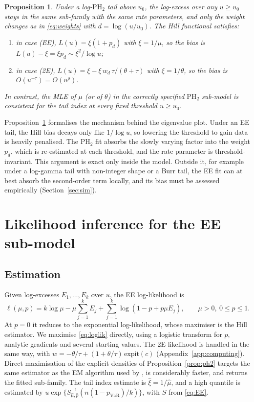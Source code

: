 \documentclass[12pt]{article}
\newtheorem{proposition}[theorem]{Proposition}
\theoremstyle{definition}
\theoremstyle{remark}
\newcommand{\PH}{\mathrm{PH}}
\begin{document}
\begin{proposition}\label{prop:hill}
Under a log-$\PH_2$ tail above $u_0$, the log-excess over any $u\ge u_0$ stays in the same sub-family with the same rate parameters, and only the weight changes as in \eqref{eq:weights} with $d=\log(u/u_0)$. The Hill functional satisfies:
\begin{enumerate}
\item[(a)] in case \textup{(EE)}, $L(u)=\xi(1+p_d)$ with $\xi=1/\mu$, so the bias is $L(u)-\xi=\xi p_d\sim \xi^2/\log u$;
\item[(b)] in case \textup{(2E)}, $L(u)=\xi-\xi\,w_d\,\tau/(\theta+\tau)$ with $\xi=1/\theta$, so the bias is $O(u^{-\tau})=O(u^{\rho})$.
\end{enumerate}
In contrast, the MLE of $\mu$ (or of $\theta$) in the correctly specified $\PH_2$ sub-model is consistent for the tail index at every fixed threshold $u\ge u_0$.
\end{proposition}

Proposition~\ref{prop:hill} formalises the mechanism behind the eigenvalue plot. Under an EE tail, the Hill bias decays only like $1/\log u$, so lowering the threshold to gain data is heavily penalised. The PH$_2$ fit absorbs the slowly varying factor into the weight $p_d$, which is re-estimated at each threshold, and the rate parameter is threshold-invariant. This argument is exact only inside the model. Outside it, for example under a log-gamma tail with non-integer shape or a Burr tail, the EE fit can at best absorb the second-order term locally, and its bias must be assessed empirically (Section~\ref{sec:sim}).

\section{Likelihood inference for the EE sub-model}\label{sec:inference}

\subsection{Estimation}

Given log-excesses $E_1,\dots,E_k$ over $u$, the EE log-likelihood is
\begin{equation}\label{eq:loglik}
\ell(\mu,p)=k\log\mu-\mu\sum_{j=1}^kE_j+\sum_{j=1}^k\log(1-p+p\mu E_j),\qquad \mu>0,\ 0\le p\le1 .
\end{equation}
At $p=0$ it reduces to the exponential log-likelihood, whose maximiser is the Hill estimator. We maximise \eqref{eq:loglik} directly, using a logistic transform for $p$, analytic gradients and several starting values. The 2E likelihood is handled in the same way, with $w=-\theta/\tau+(1+\theta/\tau)\,\mathrm{expit}(c)$ (Appendix~\ref{app:computing}). Direct maximisation of the explicit densities of Proposition~\ref{prop:ph2} targets the same estimator as the EM algorithm used by \citet{KimKim2015}, is considerably faster, and returns the fitted sub-family. The tail index estimate is $\hat\xi=1/\hat\mu$, and a high quantile is estimated by $u\exp\{S^{-1}_{\hat\mu,\hat p}(n(1-p_{\mathrm{VaR}})/k)\}$, with $S$ from \eqref{eq:EE}.
\end{document}

